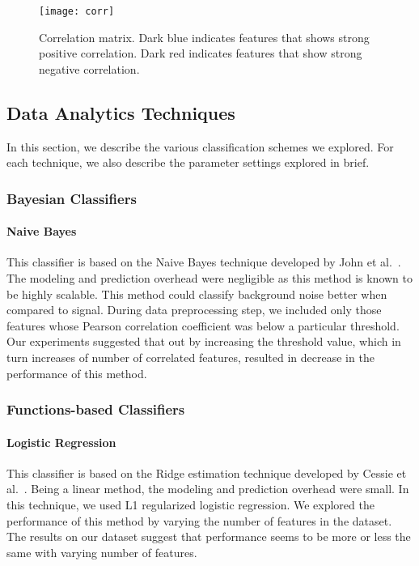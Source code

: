 \begin{figure}[h]
\centering
\texttt{[image: corr]}
\caption{Correlation matrix. Dark blue indicates features that shows strong positive correlation. Dark red indicates features that show strong negative correlation.}
\label{fig:correlation-matrix}
\end{figure}



\subsection{Data Analytics Techniques}

In this section, we describe the various classification schemes we explored. For each technique, we also describe the parameter settings explored in brief.


\subsubsection{Bayesian Classifiers}

\paragraph{Naive Bayes}

This classifier is based on the Naive Bayes technique developed by John et al.~\cite{NaiveBayes}. The modeling and prediction overhead were negligible as this method is known to be highly scalable. This method could classify background noise better when compared to signal. During data preprocessing step, we included only those features whose Pearson correlation coefficient was below a particular threshold. Our experiments suggested that out by increasing the threshold value, which in turn increases of number of correlated features, resulted in decrease in the performance of this method.

\subsubsection{Functions-based Classifiers}

\paragraph{Logistic Regression}

This classifier is based on the Ridge estimation technique developed by Cessie et al.~\cite{Logistic Regression}. Being a linear method, the modeling and prediction overhead were small. In this technique, we used L1 regularized logistic regression. We explored the performance of this method
by varying the number of features in the dataset. The results on our dataset suggest that performance seems to be more or less the same with varying number of features.

